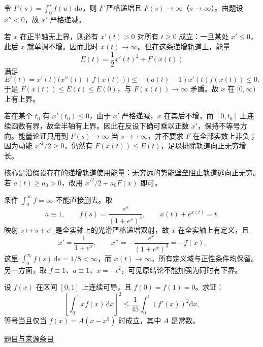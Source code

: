 \documentclass[UTF8,12pt,a4paper,fontset=fandol]{ctexart}
\begin{document}
\begin{solve}\label{ans:fin06-lo:8}

令 $F(s)=\int_0^sf(u)\,\mathrm du$，则 $F$ 严格递增且 $F(s)\to\infty$（$s\to\infty$）。由题设 $x''<0$，故 $x'$ 严格递减。

若 $x$ 在正半轴无上界，则必有 $x'(t)>0$ 对所有 $t\ge0$ 成立：一旦某处 $x'\le0$，此后 $x$ 就单调不增。因而此时 $x(t)\to\infty$。但在这条递增轨道上，能量
\[
E(t)=\frac12x'(t)^2+F(x(t))
\]
满足
\[
E'(t)=x'(t)\bigl(x''(t)+f(x(t))\bigr)
\le-(a(t)-1)x'(t)f(x(t))\le0.
\]
于是 $F(x(t))\le E(t)\le E(0)$，与 $F(x(t))\to\infty$ 矛盾。故 $x$ 在 $[0,\infty)$ 上有上界。

若在某个 $t_0$ 有 $x'(t_0)\le0$，由于 $x'$ 严格递减，$x$ 在其后不增，而 $[0,t_0]$ 上连续函数有界，故全半轴有上界。因此在反设下确可乘以正数 $x'$，保持不等号方向。能量论证只用到 $F(s)\to\infty$ 当 $s\to+\infty$，并不要求 $F$ 在全部实数上非负；因为动能 $x'^2/2\ge0$，仍然有 $F(x(t))\le E(t)$，足以排除轨道向正无穷增长。

\end{solve}

\begin{remark}[方法与条件]核心是沿假设存在的递增轨道使用\hyperref[app:dynamics-energy]{能量}：无穷远的势能壁垒阻止轨道逃向正无穷。若 $a(t)\ge a_0>0$，改用 $x'^2/2+a_0F(x)$ 即可。

条件 $\int_0^\infty f=\infty$ 不能直接删去。取
\[
a\equiv1,\qquad f(s)=\frac{e^s}{(1+e^s)^3},
\qquad x(t)+e^{x(t)}=t.
\]
映射 $s\mapsto s+e^s$ 是全实轴上的光滑严格递增双射，故 $x$ 在全实轴上有定义，且
\[
x'=\frac1{1+e^x},\qquad
x''=-\frac{e^x}{(1+e^x)^3}=-f(x).
\]
这里 $\int_0^\infty f(s)\,\mathrm ds=1/8<\infty$，而 $x(t)\to\infty$。所有定义域与正性条件均保留。另一方面，取 $f\equiv1$、$a\equiv1$、$x=-t^2$，可见原结论不能加强为同时有下界。\end{remark}

\begin{example}\label{ex:fin06-lo:9}\label{pr:fin06-lo:9}

设 $f(x)$ 在区间 $[0,1]$ 上连续可导，且 $f(0)=f(1)=0$。求证：
\[
\left[\int_0^1 xf(x)\,\mathrm{d}x\right]^2\le\frac{1}{45}\int_0^1\left(f'(x)\right)^2\mathrm{d}x,
\]
等号当且仅当 $f(x)=A\left(x-x^3\right)$ 时成立，其中 $A$ 是常数。

\par\href{https://github.com/lzxcr/cmc-mathematics/blob/64916fa1fdbc3e444a652eca204d5669058ee321/src/problems/finals/06/09.md}{题目与来源条目}

\end{example}
\end{document}
